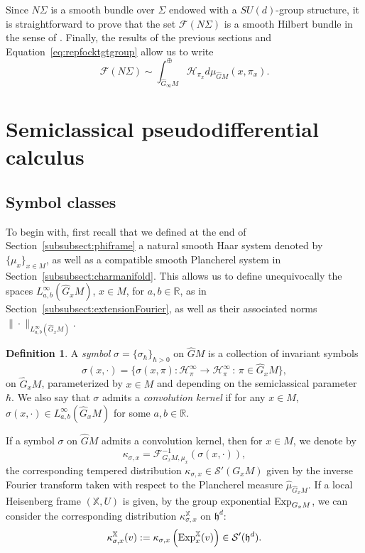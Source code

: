 \documentclass[12pt,a4paper]{amsart}
\theoremstyle{plain}
\theoremstyle{definition}
\newtheorem{definition}[theorem]{Definition}
\theoremstyle{remark}
\numberwithin{equation}{section}
\theoremstyle{definition}
\def\R{{\mathbb R}}%
\def \Exp{{\rm Exp}}
\def \cS{\mathcal{S}}
\def \bX{\mathbb{X}}
\def \Ghat{\widehat{G}}
\def \cH{\mathcal{H}}
\def \cF{\mathcal{F}}
\def \fh{\mathfrak{h}}
\numberwithin{equation}{section}
\begin{document}
Since $N\Sigma$ is a smooth bundle over $\Sigma$ endowed with a $SU(d)$-group structure, it is straightforward to prove that the set $\mathscr{F}(N\Sigma)$ is a smooth Hilbert bundle in the sense of \cite{Lang}.
Finally, the results of the previous sections and Equation~\eqref{eq:repfocktgtgroup} allow us to write
\begin{equation}
    \label{eq:fockrealisation}
    \mathscr{F}(N\Sigma) \sim \int_{\Ghat_\infty M}^\oplus \cH_{\pi_x} d\mu_{\Ghat M}(x,\pi_x).
\end{equation}


\section{Semiclassical pseudodifferential calculus}
\label{sect:semipseudocalc}

\subsection{Symbol classes} 
\label{subsect:symbolclasses}
To begin with, first recall that we defined at the end of Section~\ref{subsubsect:phiframe} a natural smooth Haar system denoted by $\{\mu_x\}_{x\in M}$, as well as a compatible smooth Plancherel system in Section~\ref{subsubsect:charmanifold}. This allows us to define unequivocally the spaces $L_{a,b}^\infty(\Ghat_x M)$, $x\in M$, for $a,b\in\R$, as in Section~\ref{subsubsect:extensionFourier}, as well as their associated norms $\|\cdot\|_{L_{a,b}^\infty(\Ghat_x M)}$.

\begin{definition}
    \label{def:symbols}
    A \emph{symbol} $\sigma= \{\sigma_\hbar\}_{\hbar>0}$ on $\Ghat M$ is a collection of invariant symbols 
    \begin{equation*}
       \sigma(x,\cdot) = \{\sigma(x,\pi):\cH_{\pi}^{\infty}\rightarrow\cH_{\pi}^{\infty}\,:\,\pi\in\Ghat_x M\},
    \end{equation*}
    on $\Ghat_x M$, parameterized by $x\in M$ and depending on the semiclassical parameter $\hbar$. 
    We also say that $\sigma$ admits a \emph{convolution kernel} if for any $x\in M$, $\sigma(x,\cdot)\in L_{a,b}^\infty(\Ghat_x M)$ for some $a,b\in\R$.
\end{definition}

If a symbol $\sigma$ on $\Ghat M$ admits a convolution kernel, then for $x\in M$, we denote by
\begin{equation*}
    \kappa_{\sigma,x} = \cF_{G_x M, \mu_x}^{-1}(\sigma(x,\cdot)),
\end{equation*}
the corresponding tempered distribution $\kappa_{\sigma,x}\in \cS'(G_x M)$ given by the inverse Fourier transform taken with respect to the Plancherel measure $\hat{\mu}_{\Ghat_x M}$. If a local Heisenberg frame $(\bX,U)$ is given, by the group exponential $\Exp_{G_x M}$, we can consider the corresponding distribution $\kappa_{\sigma,x}^{\bX}$ on $\fh^d$:
\begin{equation}
    \label{eq:localassociatedkernel}
    \kappa_{\sigma,x}^{\bX}(v) := \kappa_{\sigma,x}\left(\Exp_{x}^{\bX}(v)\right) \in\cS'(\fh^d).
\end{equation}
\end{document}
